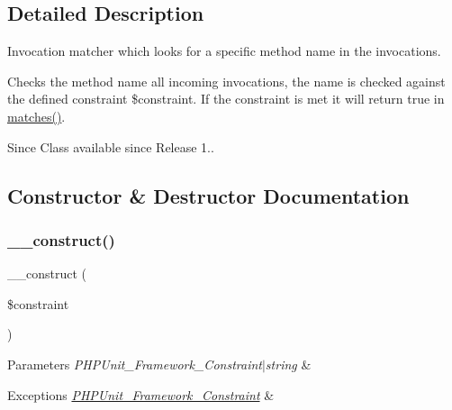 \subsection{Detailed Description}
Invocation matcher which looks for a specific method name in the invocations.

Checks the method name all incoming invocations, the name is checked against the defined constraint \$constraint. If the constraint is met it will return true in \mbox{\hyperlink{class_p_h_p_unit___framework___mock_object___matcher___method_name_a4988c6fa11e275302172d0a4ae32dd3a}{matches()}}.

\begin{DoxySince}{Since}
Class available since Release 1.. 
\end{DoxySince}


\subsection{Constructor \& Destructor Documentation}
\mbox{\label{class_p_h_p_unit___framework___mock_object___matcher___method_name_a6e8cb639ef35c3654e8528d5a5c927e6}} 
\subsubsection{\texorpdfstring{\+\_\+\+\_\+construct()}{\_\_construct()}}
{\footnotesize\ttfamily \+\_\+\+\_\+construct (\begin{DoxyParamCaption}\item[{}]{\$constraint }\end{DoxyParamCaption})}


\begin{DoxyParams}{Parameters}
{\em P\+H\+P\+Unit\+\_\+\+Framework\+\_\+\+Constraint$\vert$string} & \\
\hline
\end{DoxyParams}

\begin{DoxyExceptions}{Exceptions}
{\em \mbox{\hyperlink{class_p_h_p_unit___framework___constraint}{P\+H\+P\+Unit\+\_\+\+Framework\+\_\+\+Constraint}}} & \\
\hline
\end{DoxyExceptions}



